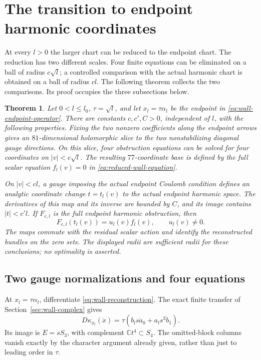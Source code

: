 \documentclass[11pt]{amsart}
\newtheorem{theorem}{Theorem}[section]
\theoremstyle{definition}
\theoremstyle{remark}
\newcommand{\CC}{\mathbb C}
\begin{document}
\section{The transition to endpoint harmonic coordinates}\label{sec:transition}

At every $l>0$ the larger chart can be reduced to the endpoint
chart. The reduction has two different scales. Four finite equations
can be eliminated on a ball of radius $c\sqrt l$; a controlled comparison
with the actual harmonic chart is obtained on a ball of radius $cl$.
The following theorem collects the two comparisons. Its proof occupies
the three subsections below.

\begin{theorem}\label{thm:chart-transition}
Let $0<l\le l_0$, $\tau=\sqrt l$, and let $x_l=\tau\alpha_l$ be
the endpoint in \eqref{eq:wall-endpoint-operator}. There are constants
$c,c',C>0$, independent of $l$, with the following properties.
Fixing the two nonzero coefficients along the endpoint arrows gives an
$81$-dimensional holomorphic slice to the two nonstabilizing diagonal
gauge directions. On this slice, four obstruction equations can be
solved for four coordinates on $|v|<c\sqrt l$. The resulting
$77$-coordinate base is defined by the full scalar equation $f_l(v)=0$
in \eqref{eq:reduced-wall-equation}.

On $|v|<cl$, a gauge imposing the actual endpoint Coulomb condition
defines an analytic coordinate change $t=t_l(v)$ to the actual endpoint
harmonic space. The derivatives of this map and its inverse are bounded
by $C$, and its image contains $|t|<c'l$. If $F_{e,l}$ is the full
endpoint harmonic obstruction, then
\[
 F_{e,l}(t_l(v))=u_l(v)f_l(v),\qquad u_l(v)\ne0.
\]
The maps commute with the residual scalar action and identify the
reconstructed bundles on the zero sets. The displayed radii are
sufficient radii for these conclusions; no optimality is asserted.
\end{theorem}

\subsection{Two gauge normalizations and four equations}
At $x_l=\tau\alpha_l$, differentiate \eqref{eq:wall-reconstruction}.
The exact finite transfer of Section~\ref{sec:wall-complex} gives
\begin{equation}\label{eq:wall-obstruction-linearization}
 D\kappa_{x_l}(\dot x)
 =\tau(b_ls\dot a_0+a_ls^3\dot b_1).
\end{equation}
Its image is $E=sS_3$, with complement $\CC t^4\subset S_4$.
The omitted-block columns vanish exactly by the character argument
already given, rather than just to leading order in $\tau$.
\end{document}
